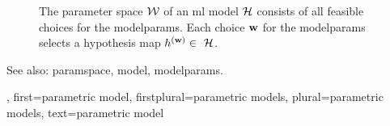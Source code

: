 {{\begin{figure}[H]
\begin{center}
			\end{center} 
			\caption{The \gls{parameter} space $\mathcal{W}$ of an \gls{ml} \gls{model} $\mathcal{H}$ consists of all 
			feasible choices for the \gls{modelparams}. Each choice ${\bf w}$ for the \gls{modelparams} 
			selects a \gls{hypothesis} \gls{map} $\hypothesis^{(\weights)} \in \hypospace$.
				 \label{fig_param_model_dict}} 
			\end{figure}
			See also: \gls{paramspace}, \gls{model}, \gls{modelparams}.},
		first={parametric model},
		firstplural={parametric models},
		plural={parametric models},
		text={parametric model}
}


